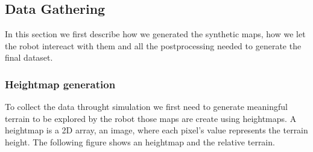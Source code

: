 \documentclass[../document.tex]{subfiles}
\begin{document}
\subsection{Data Gathering}
In this section we first describe how we generated the synthetic maps, how we let the robot intereact with them and all the postprocessing needed to generate the final dataset.
\subsubsection{Heightmap generation}
To collect the data throught simulation we first need to generate meaningful terrain to be explored by the robot those maps are create
using heightmaps. A heightmap is a 2D array, an image, where each pixel's value represents the terrain height. The following figure shows an heightmap and the relative terrain.
\end{document}

